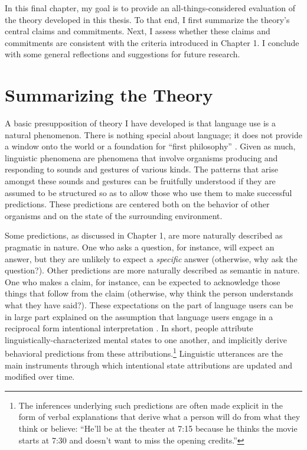 In this final chapter, my goal is to provide an all-things-considered evaluation of the theory developed in this thesis. To that end, I first summarize the theory's central claims and commitments. Next, I assess whether these claims and commitments are consistent with the criteria introduced in Chapter 1. I conclude with some general reflections and suggestions for future research.  

\section{Summarizing the Theory}

A basic presupposition of theory I have developed is that language use is a natural phenomenon. There is nothing special about language; it does not provide a window onto the world or a foundation for ``first philosophy'' \citep[see][]{Stanley:2008}. Given as much, linguistic phenomena are phenomena that involve organisms producing and responding to sounds and gestures of various kinds. The patterns that arise amongst these sounds and gestures can be fruitfully understood if they are assumed to be structured so as to allow those who use them to make successful predictions. These predictions are centered both on the behavior of other organisms and on the state of the surrounding environment. 

Some predictions, as discussed in Chapter 1, are more naturally described as pragmatic in nature. One who asks a question, for instance, will expect an answer, but they are unlikely to expect a \textit{specific} answer (otherwise, why ask the question?). Other predictions are more naturally described as semantic in nature. One who makes a claim, for instance, can be expected to acknowledge those things that follow from the claim (otherwise, why think the person understands what they have said?). These expectations on the part of language users can be in large part explained on the assumption that language users engage in a reciprocal form intentional interpretation \citep{Brandom:1994,Dennett:1987}. In short, people attribute linguistically-characterized mental states to one another, and implicitly derive behavioral predictions from these attributions.\footnote{The inferences underlying such predictions are often made explicit in the form of verbal explanations that derive what a person will do from what they think or believe: ``He'll be at the theater at 7:15 because he thinks the movie starts at 7:30 and doesn't want to miss the opening credits.''} Linguistic utterances are the main instruments through which intentional state attributions are updated and modified over time. 

